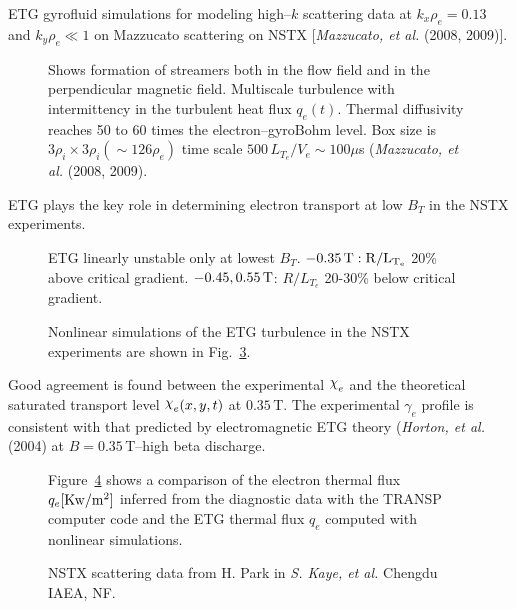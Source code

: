 \documentclass[a4paper,openany,12pt]{book}
\def\chix{\raise.5ex\hbox{$\chi$}}
\begin{document}
ETG gyrofluid simulations for modeling high--$k$ scattering data at $k_x\rho_e=0.13$ and $k_y\rho_e\ll 1$ on Mazzucato scattering on NSTX [\emph{Mazzucato, et al.} (2008, 2009)].
%
\begin{figure}[H]
\centerline{}
\caption{Shows formation of streamers both in the flow field and in the perpendicular magnetic field. Multiscale turbulence with intermittency in the turbulent heat flux $q_e(t)$. Thermal diffusivity reaches 50 to 60 times the electron--gyroBohm level. Box size is $3\rho_i\times 3\rho_i (\sim 126\rho_e)$ time scale $500\,L_{T_e}/V_e\sim 100\mu$s 
(\emph{Mazzucato, et al.} (2008, 2009).}
\label{F9.33}
\end{figure}
%
ETG plays the key role in determining electron transport at low $B_T$ in the NSTX experiments.
%
\begin{figure}[H]
\centerline{}
\caption{ETG linearly unstable only at lowest $B_T$. $-0.35\,\rm T: R/L_{T_e}$ 20\% above critical gradient. $-0.45, 0.55\,\rm T$: $R/L_{T_e}$ 20-30\% below critical gradient.}
\label{F9.34}
\end{figure}
%
\begin{figure}[H]
\centerline{}
\caption{Nonlinear simulations of the ETG turbulence in the NSTX experiments are shown in Fig.~\ref{F9.35}.}
\label{F9.35}
\end{figure}
%
Good agreement is found between the experimental $\chix_e$ and the theoretical saturated transport level $\chix_e(x,y,t)$ at $0.35\,$T. The experimental $\gamma_e$ profile is consistent with that predicted by electromagnetic ETG theory (\emph{Horton, et al.} (2004) at $B=0.35\,$T--high beta discharge.
%
\begin{figure}[H]
\centerline{}
\caption{Figure~\ref{F9.36} shows a comparison of the electron thermal flux $q_e[\rm Kw/m^2]$ inferred from the diagnostic data with the TRANSP computer code and the ETG thermal flux $q_e$ computed with nonlinear simulations.}
\label{F9.36}
\end{figure}
%
\begin{figure}[H]
\centerline{}
\centerline{}
\caption{NSTX scattering data from H. Park in \emph{S. Kaye, et al.} Chengdu IAEA, NF.}
\label{F9.37}
\end{figure}
%
\end{document}
